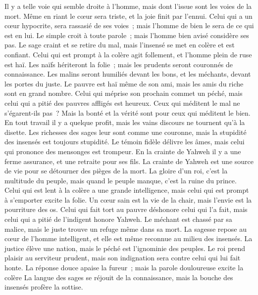 \begin{multicols}{2}
Il y a telle voie qui semble droite à l'homme, mais dont l'issue sont les voies de la mort.
Même en riant le cœur sera triste, et la joie finit par l'ennui.
Celui qui a un cœur hypocrite, sera rassasié de ses voies~; mais l'homme de bien le sera de ce qui est en lui.
Le simple croit à toute parole~; mais l'homme bien avisé considère ses pas.
Le sage craint et se retire du mal, mais l'insensé se met en colère et est confiant.
Celui qui est prompt à la colère agit follement, et l'homme plein de ruse est haï.
Les naïfs hériteront la folie~; mais les prudents seront couronnés de connaissance.
Les malins seront humiliés devant les bons, et les méchants, devant les portes du juste.
Le pauvre est haï même de son ami, mais les amis du riche sont en grand nombre.
Celui qui méprise son prochain commet un péché, mais celui qui a pitié des pauvres affligés est heureux.
Ceux qui méditent le mal ne s'égarent-ils pas~? Mais la bonté et la vérité sont pour ceux qui méditent le bien.
En tout travail il y a quelque profit, mais les vains discours ne tournent qu'à la disette.
Les richesses des sages leur sont comme une couronne, mais la stupidité des insensés est toujours stupidité.
Le témoin fidèle délivre les âmes, mais celui qui prononce des mensonges est trompeur.
En la crainte de Yahweh il y a une ferme assurance, et une retraite pour ses fils.
La crainte de Yahweh est une source de vie pour se détourner des pièges de la mort.
La gloire d'un roi, c'est la multitude du peuple, mais quand le peuple manque, c'est la ruine du prince.
Celui qui est lent à la colère a une grande intelligence, mais celui qui est prompt à s'emporter excite la folie.
Un cœur sain est la vie de la chair, mais l'envie est la pourriture des os.
Celui qui fait tort au pauvre déshonore celui qui l'a fait, mais celui qui a pitié de l'indigent honore Yahweh.
Le méchant est chassé par sa malice, mais le juste trouve un refuge même dans sa mort.
La sagesse repose au cœur de l'homme intelligent, et elle est même reconnue au milieu des insensés.
La justice élève une nation, mais le péché est l'ignominie des peuples.
Le roi prend plaisir au serviteur prudent, mais son indignation sera contre celui qui lui fait honte.
\VerseOne{}La réponse douce apaise la fureur~; mais la parole douloureuse excite la colère
La langue des sages se réjouit de la connaissance, mais la bouche des insensés profère la sottise.

\end{multicols}
